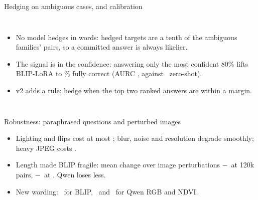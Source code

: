 \documentclass[aspectratio=169,10pt,t]{beamer}
\begin{document}
\begin{frame}{Hedging on ambiguous cases, and calibration}
\begin{columns}[T]
\resizebox{\textwidth}{!}{}
\medskip
\begin{itemize}
\item No model hedges in words: hedged targets are a tenth of the ambiguous families' pairs, so a committed answer is always likelier.
\item The signal is in the confidence: answering only the most confident 80\% lifts BLIP-LoRA to \blipAccEighty\% fully correct (AURC \blipAurc, against \zeroAurc\ zero-shot).
\item v2 adds a rule: hedge when the top two ranked answers are within a margin.
\end{itemize}
\end{columns}
\end{frame}

\begin{frame}{Robustness: paraphrased questions and perturbed images}
\centering
{}
\begin{itemize}
\item Lighting and flips cost at most \blipLightDrop; blur, noise and resolution degrade smoothly; heavy JPEG costs \blipJpegDrop.
\item Length made BLIP fragile: mean change over image perturbations $-$\vtwoPerturbed\ at 120k pairs, $-$\blipPerturbed\ at \finalPairs. Qwen loses less.
\item New wording: \blipParaphraseDrop\ for BLIP, \servedRgbParaphraseDrop\ and \servedNdviParaphraseDrop\ for Qwen RGB and NDVI.
\end{itemize}
\end{frame}
\end{document}
